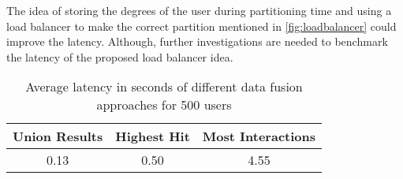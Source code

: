 The idea of storing the degrees of the user during partitioning time and using a load balancer to make the correct partition mentioned in \ref{fig:loadbalancer} could improve the latency. Although, further investigations are needed to benchmark the latency of the proposed load balancer idea.


\begin{table}[!ht]
    \centering
    \caption{Average latency in seconds of different data fusion approaches for 500 users}
    \label{tab:data-fusion-latency}
    \begin{tabular}{|c|c|c|}
        \hline
        \textbf{Union Results} & \textbf{Highest Hit} & \textbf{Most Interactions} \\
        \hline
        0.13 & 0.50 & 4.55 \\
        \hline
    \end{tabular}
\end{table}
